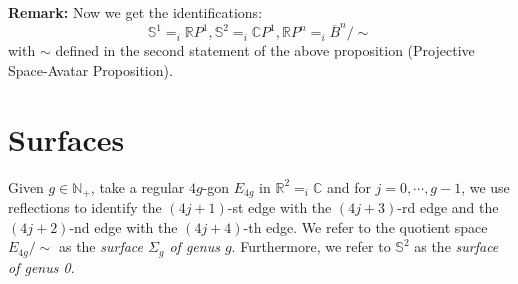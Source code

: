 \noindent\textbf{Remark:} Now we get the identifications:
$$\mathbb{S}^1 =_i \mathbb{R}P^1, \mathbb{S}^2 =_i \mathbb{C}P^1, \mathbb{R}P^n=_i \overline{B}^n/\sim$$
with $\sim$ defined in the second statement of the above proposition (Projective Space-Avatar Proposition).

\section{Surfaces}

\begin{definition}
    Given $g \in \mathbb{N}_+$, take a regular $4g$-gon $E_{4g}$ in $\mathbb{R}^2=_i \mathbb{C}$ and for $j=0, \cdots, g-1$, we use reflections to identify the $(4j+1)$-st edge with the $(4j+3)$-rd edge and the $(4j+2)$-nd edge with the $(4j+4)$-th edge. We refer to the quotient space $E_{4g}/\sim$ as the \textit{surface $\Sigma_g$ of genus $g$}. Furthermore, we refer to $\mathbb{S}^2$ as the \textit{surface of genus 0}.
\end{definition}

